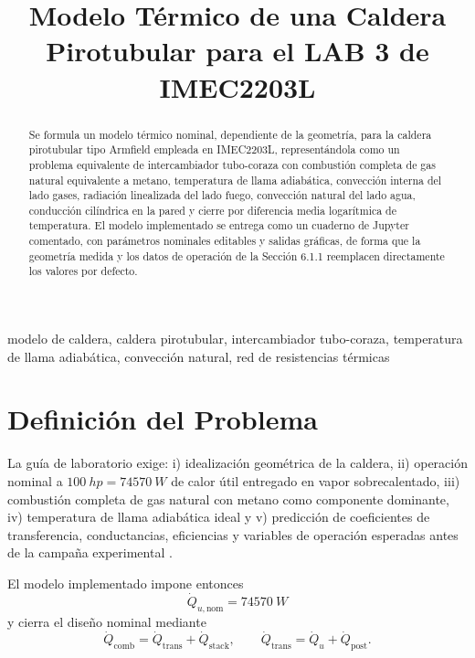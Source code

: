 \documentclass[conference]{IEEEtran}
\title{Modelo T\'ermico de una Caldera Pirotubular para el LAB 3 de IMEC2203L}
\author{
\IEEEauthorblockN{Nombre Estudiante 1, Nombre Estudiante 2}
\IEEEauthorblockA{Departamento de Ingenier\'ia Mec\'anica\\
Universidad de los Andes\\
Bogot\'a, Colombia\\
\texttt{replace.with.real.emails@uniandes.edu.co}}
}
\begin{document}
\maketitle

\begin{abstract}
Se formula un modelo t\'ermico nominal, dependiente de la geometr\'ia, para la caldera pirotubular tipo Armfield empleada en IMEC2203L, represent\'andola como un problema equivalente de intercambiador tubo-coraza con combusti\'on completa de gas natural equivalente a metano, temperatura de llama adiab\'atica, convecci\'on interna del lado gases, radiaci\'on linealizada del lado fuego, convecci\'on natural del lado agua, conducci\'on cil\'indrica en la pared y cierre por diferencia media logar\'itmica de temperatura. El modelo implementado se entrega como un cuaderno de Jupyter comentado, con par\'ametros nominales editables y salidas gr\'aficas, de forma que la geometr\'ia medida y los datos de operaci\'on de la Secci\'on 6.1.1 reemplacen directamente los valores por defecto.
\end{abstract}

\begin{IEEEkeywords}
modelo de caldera, caldera pirotubular, intercambiador tubo-coraza, temperatura de llama adiab\'atica, convecci\'on natural, red de resistencias t\'ermicas
\end{IEEEkeywords}

\section{Definici\'on del Problema}
La gu\'ia de laboratorio exige: i) idealizaci\'on geom\'etrica de la caldera, ii) operaci\'on nominal a $\SI{100}{hp}=\SI{74570}{W}$ de calor \'util entregado en vapor sobrecalentado, iii) combusti\'on completa de gas natural con metano como componente dominante, iv) temperatura de llama adiab\'atica ideal y v) predicci\'on de coeficientes de transferencia, conductancias, eficiencias y variables de operaci\'on esperadas antes de la campa\~na experimental \cite{uniandes2026}.

El modelo implementado impone entonces
\begin{equation}
\dot{Q}_{u,\mathrm{nom}}=\SI{74570}{W}
\label{eq:qnom}
\end{equation}
y cierra el dise\~no nominal mediante
\begin{equation}
\dot{Q}_{\mathrm{comb}}=\dot{Q}_{\mathrm{trans}}+\dot{Q}_{\mathrm{stack}},
\qquad
\dot{Q}_{\mathrm{trans}}=\dot{Q}_{u}+\dot{Q}_{\mathrm{post}}.
\label{eq:global_balance}
\end{equation}
\end{document}

